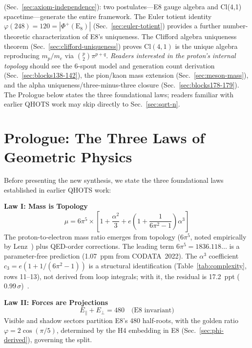 \documentclass[aps,prd,twocolumn,superscriptaddress,floatfix,nofootinbib]{revtex4-2}
\theoremstyle{definition}
\theoremstyle{remark}
\newcommand{\vp}{\varphi}
\begin{document}
(Sec.~\ref{sec:axiom-independence}): two postulates---E8 gauge algebra and Cl(4,1) spacetime---generate the entire framework. The Euler totient identity $\varphi(248)=120=|\Phi^+(\mathrm{E}_8)|$ (Sec.~\ref{sec:euler-totient}) provides a further number-theoretic characterization of E8's uniqueness. The Clifford algebra uniqueness theorem (Sec.~\ref{sec:clifford-uniqueness}) proves $\mathrm{Cl}(4,1)$ is the unique algebra reproducing $m_p/m_e$ via $\binom{p}{2}\pi^{p+q}$. \textit{Readers interested in the proton's internal topology} should see the 6-spout model and generation count derivation (Sec.~\ref{sec:blocks138-142}), the pion/kaon mass extension (Sec.~\ref{sec:meson-mass}), and the alpha uniqueness/three-minus-three closure (Sec.~\ref{sec:blocks178-179}). The Prologue below states the three foundational laws; readers familiar with earlier QHOTS work may skip directly to Sec.~\ref{sec:sqrt-n}.

\section{Prologue: The Three Laws of Geometric Physics}

Before presenting the new synthesis, we state the three foundational laws established in earlier QHOTS work:

\textbf{Law I: Mass is Topology}
\begin{equation}
\mu = 6\pi^5 \times \left[1 + \frac{\alpha^2}{3} + e\left(1+\frac{1}{6\pi^2-1}\right)\alpha^3\right]
\end{equation}
The proton-to-electron mass ratio emerges from topology ($6\pi^5$, noted empirically by Lenz~\cite{lenz1951}) plus QED-order corrections. The leading term $6\pi^5 = 1836.118\ldots$ is a parameter-free prediction (1.07~ppm from CODATA~2022). The $\alpha^3$ coefficient $c_3 = e(1+1/(6\pi^2-1))$ is a structural identification (Table~\ref{tab:complexity}, rows 11--13), not derived from loop integrals; with it, the residual is 17.2~ppt ($0.99\,\sigma$)~\cite{codata}.

\textbf{Law II: Forces are Projections}
\begin{equation}
E_\parallel + E_\perp = 480 \quad \text{(E8 invariant)}
\end{equation}
Visible and shadow sectors partition E8's 480 half-roots, with the golden ratio $\vp = 2\cos(\pi/5)$, determined by the H4 embedding in E8 (Sec.~\ref{sec:phi-derived}), governing the split.
\end{document}

